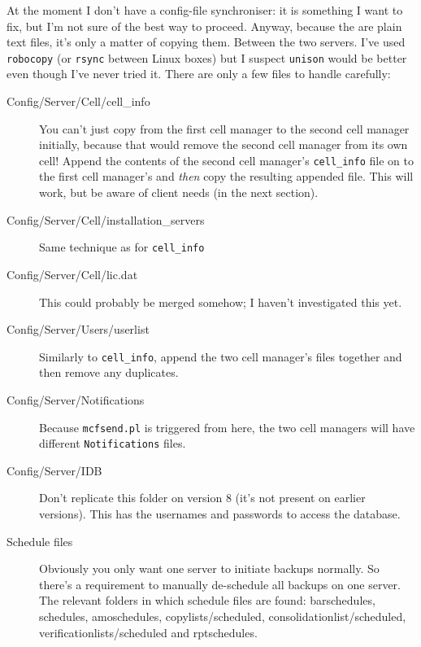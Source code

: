 \documentclass{article}
\begin{document}
At the moment I don't have a config-file synchroniser: it is something I want to fix, but I'm not sure of the best way to proceed. Anyway, because the are plain text files, it's only a matter
of copying them. Between the two servers. I've used {\tt robocopy} (or {\tt rsync} between Linux boxes) but I suspect {\tt unison} would be better even though I've never tried it. There are only a few files to handle carefully:
\begin{description}
\item[Config/Server/Cell/cell\_info] You can't just copy from the first cell manager to the second cell manager initially, because that would remove the second cell manager from its own cell! Append the contents of the second cell manager's {\tt cell\_info} file on to the first cell manager's and {\it then} copy the resulting appended file. This will work, but be aware of client needs (in the next section).
\item[Config/Server/Cell/installation\_servers] Same technique as for {\tt cell\_info}
\item[Config/Server/Cell/lic.dat] This could probably be merged somehow; I haven't investigated this yet.
\item[Config/Server/Users/userlist] Similarly to {\tt cell\_info}, append the two cell manager's files together and then remove any duplicates.
\item[Config/Server/Notifications] Because {\tt mcfsend.pl} is triggered from here, the two cell managers will have different {\tt Notifications} files.
\item[Config/Server/IDB] Don't replicate this folder on version 8 (it's not present on earlier versions). This has the usernames and passwords to access the database.
\item[Schedule files] Obviously you only want one server to initiate backups normally. So there's a requirement to manually de-schedule all backups on one server. The
relevant folders in which schedule files are found: barschedules, schedules, amoschedules, copylists/scheduled, consolidationlist/scheduled, verificationlists/scheduled and rptschedules. 
\end{description}




\clearpage
\end{document}
